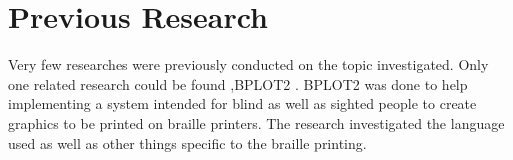 \section{Previous Research}
Very few researches were previously conducted on the topic investigated. Only one related research could be found ,BPLOT2 \cite{bplot2}. BPLOT2 was done to help implementing a system intended for blind as well as sighted people to create graphics to be printed on braille printers. The research investigated the language used as well as other things specific to the braille printing.
